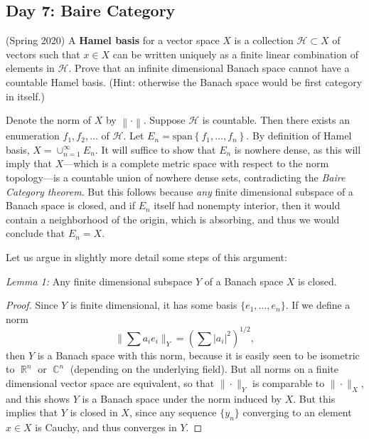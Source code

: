 \documentclass[answers]{exam}
\DeclareMathOperator{\CC}{\mathbb{C}}
\DeclareMathOperator{\RR}{\mathbb{R}}
\theoremstyle{problemstyle}
\newcommand{\norm}[1]{\left\lVert#1\right\rVert} %
\newcommand{\1}[1]{\textbf{1}_{\left[#1\right]}} %
\begin{document}
\begin{questions}
\newpage
\section{Day 7: Baire Category}

\item (Spring 2020)
  A \textbf{Hamel basis} for a vector space $X$ is a collection $\mathcal{H}\subset X$ of vectors such that $x\in X$ can be written uniquely as a finite linear combination of elements in $\mathcal{H}$. Prove that an infinite dimensional Banach space cannot have a countable Hamel basis. (Hint: otherwise the Banach space would be first category in itself.)

\begin{solution}
  Denote the norm of $X$ by $\norm{\cdot}$. Suppose $\mathcal{H}$ is countable. Then there exists an enumeration $f_{1},f_{2},\ldots$ of $\mathcal{H}$. Let $E_{n}= \text{span}\left\{ f_{1},\ldots,f_{n} \right\}$. By definition of Hamel basis, $X=\cup_{n=1}^{\infty} E_{n}$. It will suffice to show that $E_{n}$ is nowhere dense, as this will imply that $X$---which is a complete metric space with respect to the norm topology---is a countable union of nowhere dense sets, contradicting the \emph{Baire Category theorem}. But this follows because \emph{any} finite dimensional subspace of a Banach space is closed, and if $E_n$ itself had nonempty interior, then it would contain a neighborhood of the origin, which is absorbing, and thus we would conclude that $E_n = X$.

  Let us argue in slightly more detail some steps of this argument:

  \noindent \textit{Lemma 1:} Any finite dimensional subspace $Y$ of a Banach space $X$ is closed.
  \begin{proof}
  	Since $Y$ is finite dimensional, it has some basis $\{ e_1, \dots, e_n \}$. If we define a norm
  	\[ \| \sum a_i e_i \|_Y = \left( \sum |a_i|^2 \right)^{1/2}, \]
  	then $Y$ is a Banach space with this norm, because it is easily seen to be isometric to $\RR^n$ or $\CC^n$ (depending on the underlying field). But all norms on a finite dimensional vector space are equivalent, so that $\| \cdot \|_Y$ is comparable to $\| \cdot \|_X$, and this shows $Y$ is a Banach space under the norm induced by $X$. But this implies that $Y$ is closed in $X$, since any sequence $\{ y_n \}$ converging to an element $x \in X$ is Cauchy, and thus converges in $Y$.
  \end{proof}


\end{solution}
\end{questions}
\end{document}
